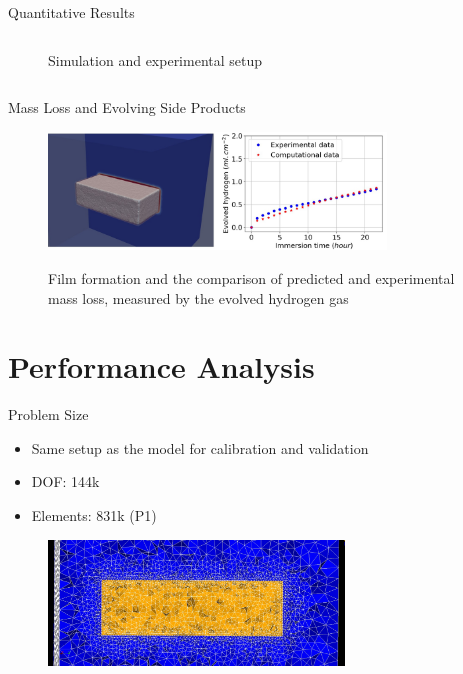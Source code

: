 \documentclass[11pt,t]{beamer}
\begin{document}
\begin{frame}[fragile]{Quantitative Results}
\begin{columns}[t]
\begin{column}{.35\textwidth}
\begin{figure}
			\footnotesize	Simulation and experimental setup 
			\end{figure}
		\end{column}
	\end{columns}

\end{frame}


\begin{frame}[fragile]{Mass Loss and Evolving Side Products}

		\begin{figure}
			\centering
			\includegraphics[width=0.8\textwidth] {numerical_results}
			
			\footnotesize Film formation and the comparison of predicted and experimental mass loss, measured by the evolved hydrogen gas
			
			
		\end{figure}

\end{frame}


\section{Performance Analysis}


\begin{frame}[fragile]{Problem Size}  

\begin{itemize}
\item
Same setup as the model for calibration and validation
\item
DOF: 144k
\item
Elements: 831k (P1)
\end{itemize}

	\begin{figure}
			\centering
			\includegraphics[width=0.7\textwidth]{mesh}
			 
	\end{figure}

\end{frame}
\end{document}
